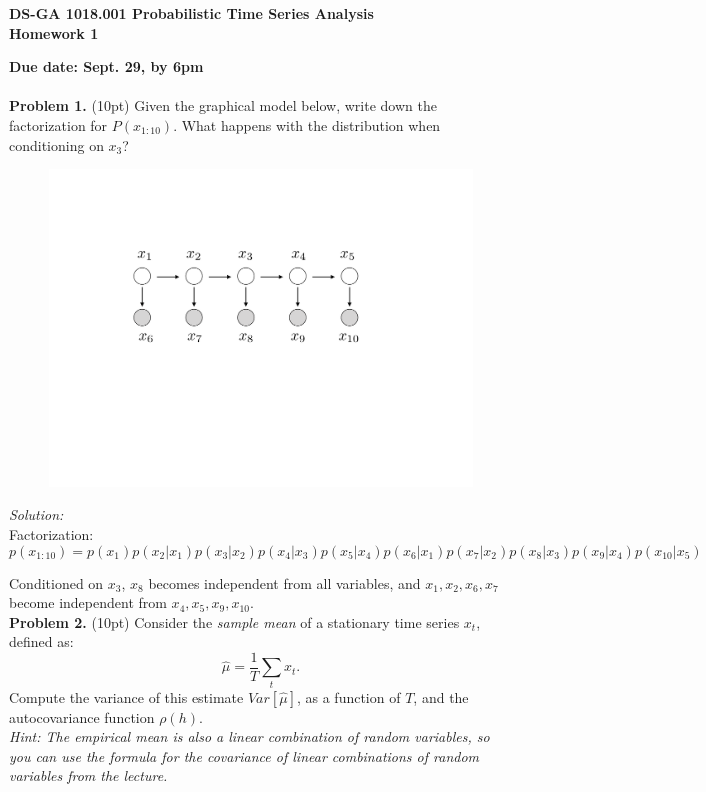 \documentclass[12pt]{article}
\begin{document}
\thispagestyle{empty}
\begin{center}

\textbf{DS-GA 1018.001 Probabilistic Time Series Analysis\\
Homework 1}
\end{center}

\noindent \textbf{Due date: Sept. 29, by 6pm}\\
\\
\noindent \textbf{Problem 1. } (10pt) Given the graphical model below, write down the factorization for $P(x_{1:10})$. What happens with the distribution when conditioning on $x_3$?
\begin{figure}[h!]
\centering
\vspace{-1mm}
\includegraphics[width=4.5in]{gmhw1.pdf}
\end{figure}

\noindent \emph{Solution:}\\
Factorization: 
\begin{equation}
p(x_{1:10}) = p(x_1) p(x_2|x_1) p(x_3|x_2)p(x_4|x_3) p(x_5|x_4)  p(x_6|x_1) p(x_7|x_2)p(x_8|x_3) p(x_9|x_4)p(x_{10}|x_5)
\end{equation}

Conditioned on $x_3$, $x_8$ becomes independent from all variables, and $x_{1},x_2,x_6,x_7$ become independent from $x_4,x_5,x_9,x_{10}$.\\

\noindent \textbf{Problem 2. }  (10pt) Consider the \emph{sample mean} of a stationary time series  $x_t$, defined as:
\begin{equation}
\hat{\mu} = \frac{1}{T} \sum_t x_t.
\end{equation}
Compute the variance of this estimate $Var[\hat{\mu}]$, as a function of $T$, and the autocovariance function $\rho(h)$.\\
\emph{Hint: The empirical mean is also a linear combination of random variables, so you can use the formula for the covariance of linear combinations of random variables from the lecture. }\\
\end{document}
